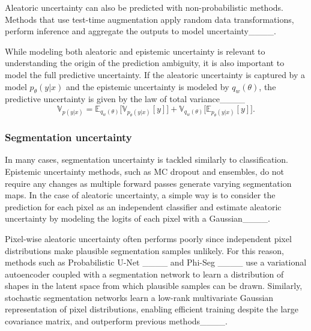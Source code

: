 Aleatoric uncertainty can also be predicted with non-probabilistic methods. Methods that use test-time augmentation apply random data transformations, perform inference and aggregate the outputs to model uncertainty____. 


While modeling both aleatoric and epistemic uncertainty is relevant to understanding the origin of the prediction ambiguity, it is also important to model the full predictive uncertainty. If the aleatoric uncertainty is captured by a model $p_\theta(y|x)$ and the epistemic uncertainty is modeled by $q_w(\theta)$, the predictive uncertainty is given by the law of total variance____
%
\begin{equation}
    \mathbb{V}_{p(y|x)} = \mathbb{E}_{q_w(\theta)}\Big[\mathbb{V}_{p_\theta(y|x)}[y]\Big] + \mathbb{V}_{q_w(\theta)}\Big[\mathbb{E}_{p_\theta(y|x)}[y]\Big].
\end{equation}
%
\subsubsection{Segmentation uncertainty}

In many cases, segmentation uncertainty is tackled similarly to classification. Epistemic uncertainty methods, such as MC dropout and ensembles, do not require any changes as multiple forward passes generate varying segmentation maps. In the case of aleatoric uncertainty, a simple way is to consider the prediction for each pixel as an independent classifier and estimate aleatoric uncertainty by modeling the logits of each pixel with a Gaussian____.


Pixel-wise aleatoric uncertainty often performs poorly since independent pixel distributions make plausible segmentation samples unlikely. For this reason, methods such as Probabilistic U-Net ____ and Phi-Seg ____ use a variational autoencoder coupled with a segmentation network to learn a distribution of shapes in the latent space from which plausible samples can be drawn. Similarly, stochastic segmentation networks learn a low-rank multivariate Gaussian representation of pixel distributions, enabling efficient training despite the large covariance matrix, and outperform previous methods____.


